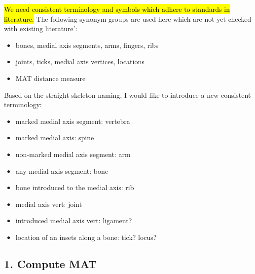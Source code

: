\hl{We need consistent terminology and symbols which adhere to standards in literature.}
The following synonym groups are used here which are not yet checked with existing literature':
\begin{itemize}
\item bones, medial axis segments, arms, fingers, ribs
\item joints, ticks, medial axis vertices, locations
\item MAT distance measure
\end{itemize}


Based on the straight skeleton naming, I would like to introduce a new consistent terminology:
\begin{itemize}
\item marked medial axis segment: vertebra
\item marked medial axis: spine
\item non-marked medial axis segment: arm
\item any medial axis segment: bone
\item bone introduced to the medial axis: rib
\item medial axis vert: joint
\item introduced medial axis vert: ligament?
\item location of an insets along a bone: tick? locus?
\end{itemize}







\subsection{1. Compute MAT}

